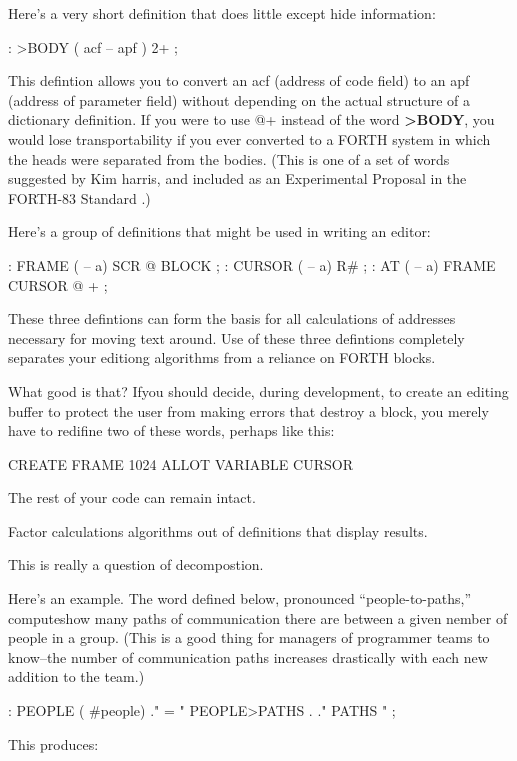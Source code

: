 Here's a very short definition that does little except hide information:

\begin{Code}
: >BODY  ( acf -- apf )  2+ ;
\end{Code}


\noindent
This defintion allows you to convert an acf (address of code field) to an apf (address of parameter field) without depending on the actual structure of a dictionary definition. If you were to use @+ instead of the word \textbf{>BODY}, you would lose transportability if you ever converted to a FORTH system in which the heads were separated from the bodies. (This is one of a set of words suggested by Kim harris, and included as an Experimental Proposal in the FORTH-83 Standard \cite{harris83}.)

Here's a group of definitions that might be used in writing an editor:

\begin{Code}
: FRAME  ( -- a)  SCR @ BLOCK ;
: CURSOR  ( -- a)  R# ;
: AT  ( -- a)  FRAME  CURSOR @ + ;
\end{Code}
These three defintions can form the basis for all calculations of addresses necessary for moving text around. Use of these three defintions completely separates your editiong algorithms from a reliance on FORTH blocks.

What good is that? Ifyou should decide, during development, to create an editing buffer to protect the user from making errors that destroy a block, you merely have to redifine two of these words, perhaps like this:

\begin{Code}
CREATE FRAME  1024 ALLOT
VARIABLE CURSOR
\end{Code}
The rest of your code can remain intact. 

\begin{tip}
Factor calculations algorithms out of definitions that display results.
\end{tip}
This is really a question of decompostion.

Here's an example. The word defined below, pronounced ``people-to-paths,'' computeshow many paths of communication there are between a given nember of people in a group. (This is a good thing for managers of programmer teams to know--the number of communication paths increases drastically with each new addition to the team.)

\begin{Code}
: PEOPLE  ( #people)
    ." = "  PEOPLE>PATHS  .  ." PATHS " ;
\end{Code}
This produces:

